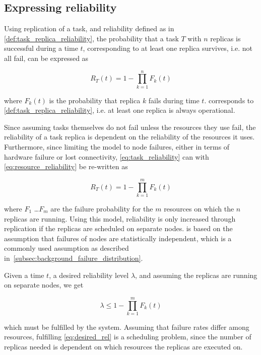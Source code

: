 \documentclass{cslthse-msc}
\begin{document}
\subsection{Expressing reliability}\label{subsec:design_reliability}
Using replication of a task, and reliability defined as in \cref{def:task_replica_reliability}, the probability that a task $T$ with $n$ replicas is successful during a time $t$, corresponding to at least one replica survives, i.e. not all fail, can be expressed as 

\begin{equation} \label{eq:task_reliability}
R_{T}(t) = 1 - \prod\limits_{k=1}^n F_{k}(t)
\end{equation}

where $F_{k}(t)$ is the probability that replica $k$ fails during time $t$.  corresponds to \cref{def:task_replica_reliability}, i.e. at least one replica is always operational.

Since assuming tasks themselves do not fail unless the resources they use fail, the reliability of a task replica is dependent on the reliability of the resources it uses. Furthermore, since limiting the model to node failures, either in terms of hardware failure or lost connectivity, \cref{eq:task_reliability} can with \cref{eq:resource_reliability} be re-written as

\begin{equation} \label{eq:task_reliability_2}
R_{T}(t) = 1 - \prod\limits_{k=1}^m F_{k}(t)
\end{equation}

where $F_1$ \dots $F_m$ are the failure probability for the $m$ resources on which the $n$ replicas are running. Using this model, reliability is only increased through replication if the replicas are scheduled on separate nodes.  is based on the assumption that failures of nodes are statistically independent, which is a commonly used assumption as described in~\cref{subsec:background_failure_distribution}.

Given a time $t$, a desired reliability level $\lambda$, and assuming the replicas are running on separate nodes, we get

\begin{equation} \label{eq:desired_rel}
\lambda \leq 1 - \prod\limits_{k=1}^m F_{k}(t)
\end{equation}

which must be fulfilled by the system. Assuming that failure rates differ among resources, fulfilling \cref{eq:desired_rel} is a scheduling problem, since the number of replicas needed is dependent on which resources the replicas are executed on.
\end{document}
